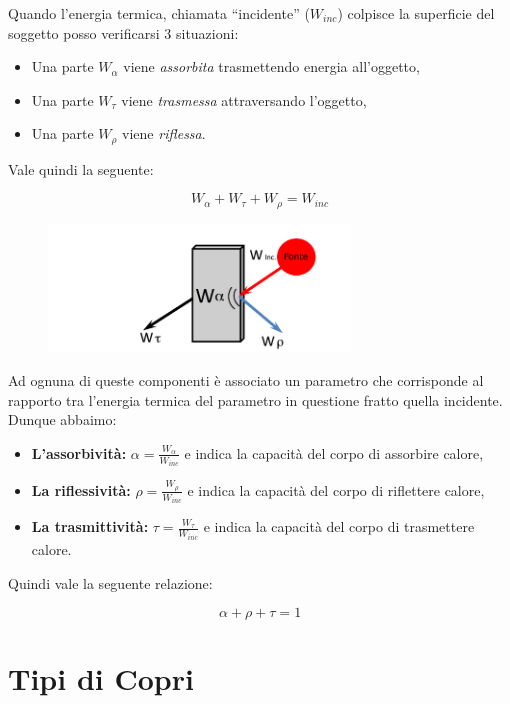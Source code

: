Quando l'energia termica, chiamata “incidente” ($W_{inc}$) colpisce la
superficie del soggetto posso verificarsi 3 situazioni:

\begin{itemize}
    \item Una parte $W_\alpha$ viene \textit{assorbita} trasmettendo energia all'oggetto,
    \item Una parte $W_\tau$ viene \textit{trasmessa} attraversando l'oggetto,
    \item Una parte $W_\rho$ viene \textit{riflessa}.
\end{itemize}

Vale quindi la seguente:

$$
    W_\alpha + W_\tau + W_\rho = W_{inc}
$$

\begin{figure}[H]
    \centering
    \includegraphics[width=8cm, keepaspectratio]{capitoli/immagini/imgs/termocamera.png}
\end{figure}

Ad ognuna di queste componenti è associato un parametro che corrisponde al
rapporto tra l'energia termica del parametro in questione fratto quella incidente.
Dunque abbaimo:

\begin{itemize}
    \item \textbf{L'assorbività:} $\alpha = \frac{W_\alpha}{W_{inc}}$ e indica la
          capacità del corpo di assorbire calore,
    \item \textbf{La riflessività:} $\rho = \frac{W_\rho}{W_{inc}}$ e indica la capacità
          del corpo di riflettere calore,
    \item \textbf{La trasmittività:} $\tau = \frac{W_\tau}{W_{inc}}$ e indica
          la capacità del corpo di trasmettere calore.
\end{itemize}

Quindi vale la seguente relazione:

$$
    \alpha + \rho + \tau = 1
$$

\section{Tipi di Copri}

